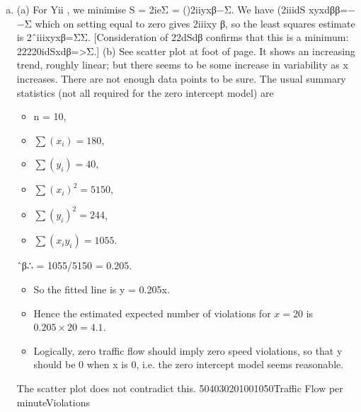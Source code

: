 \documentclass[a4paper,12pt]{article}
\begin{document}
\begin{enumerate}[(a)]
\begin{table}[ht!]
\begin{tabular}{|p{15cm}|}
\end{tabular}
    
\end{table}


\item (a) For Yii , we minimise S = 2ieΣ = ()2iiyxβ−Σ.
We have (2iiidS xyxdββ=−−Σ which on setting equal to zero gives 2iiixy β, so the least squares estimate is 2ˆiiixyxβ=ΣΣ.
[Consideration of 22dSdβ confirms that this is a minimum: 22220idSxdβ=>Σ.]
(b) See scatter plot at foot of page. It shows an increasing trend, roughly linear; but there seems to be some increase in variability as x increases. There are not enough data points to be sure.
The usual summary statistics (not all required for the zero intercept model) are
\begin{itemize}
    \item n = 10, 
    \item $\sum (x_i) = 180$, 
    \item $\sum (y_i) = 40$, 
    \item $\sum (x_i)^2 = 5150$, 
    \item $\sum (y_i)^2 = 244$,
    \item $\sum (x_iy_i) = 1055$.
\end{itemize}

ˆβ∴ =
1055/5150 =
0.205. 

\begin{itemize}
\item So the fitted line is y
= 0.205x.
\item Hence the estimated expected number of violations for $x = 20$ is $0.205 \times 20 = 4.1$.
\item Logically, zero traffic flow should imply zero speed violations, so that y should be 0 when x is 0, i.e. the zero intercept model seems reasonable.
\end{itemize} The scatter plot does not contradict this.
504030201001050Traffic Flow per minuteViolations

\end{enumerate}
\end{document}
